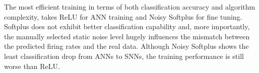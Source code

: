 \documentclass{article}
\begin{document}
	
	
	
	
	
	The most efficient training in terms of both classification accuracy and algorithm complexity, takes ReLU for ANN training and Noisy Softplus for fine tuning.
	Softplus does not exhibit better classification capability and, more importantly, the manually selected static noise level hugely influences the mismatch between the predicted firing rates and the real data.
	Although Noisy Softplus shows the least classification drop from ANNs to SNNs, the training performance is still worse than ReLU.
	
\end{document}
